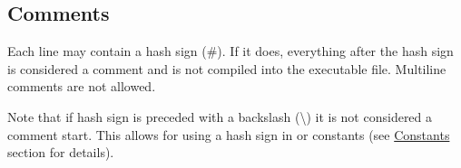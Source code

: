 \hypertarget{comments} {
	\subsection{Comments}
}

Each line may contain a hash sign (\#).
If it does, everything after the hash sign is considered a comment and
is not compiled into the executable file.
Multiline comments are not allowed.

Note that if hash sign is preceded with a backslash (\textbackslash)
it is not considered a comment start.
This allows for using a hash sign in  or  constants 
(see \hyperlink{constants}{Constants} section for details).
